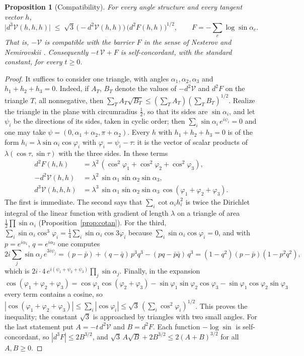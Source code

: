 \documentclass[11pt]{amsart}
\newtheorem{proposition}[theorem]{Proposition}
\theoremstyle{definition}
\theoremstyle{remark}
\begin{document}
\begin{proposition}[Compatibility]\label{prop:compat}
For every angle structure and every tangent vector $h$,
\[
\bigl|d^3\mathcal V(h,h,h)\bigr|\;\le\;\sqrt3\,\bigl(-d^2\mathcal V(h,h)\bigr)\,\bigl(d^2F(h,h)\bigr)^{1/2},\qquad F=-\sum_c\log\sin\alpha_c .
\]
That is, $-\mathcal V$ is compatible with the barrier $F$ in the sense of Nesterov and Nemirovskii \cite{NN94}. Consequently $-t\,\mathcal V+F$ is self-concordant, with the standard constant, for every $t\ge0$.
\end{proposition}

\begin{proof}
It suffices to consider one triangle, with angles $\alpha_1,\alpha_2,\alpha_3$ and $h_1+h_2+h_3=0$. Indeed, if $A_T$, $B_T$ denote the values of $-d^2\mathcal V$ and $d^2F$ on the triangle $T$, all nonnegative, then $\sum_TA_T\sqrt{B_T}\le(\sum_TA_T)(\sum_TB_T)^{1/2}$.
Realize the triangle in the plane with circumradius $\frac12$, so that its sides are $\sin\alpha_i$, and let $\psi_i$ be the directions of its sides, taken in cyclic order; then $\sum_i\sin\alpha_i\,e^{i\psi_i}=0$ and one may take $\psi=(0,\alpha_1+\alpha_2,\pi+\alpha_2)$.
Every $h$ with $h_1+h_2+h_3=0$ is of the form $h_i=\lambda\sin\alpha_i\cos\varphi_i$ with $\varphi_i=\psi_i-\tau$: it is the vector of scalar products of $\lambda(\cos\tau,\sin\tau)$ with the three sides. In these terms
\begin{align*}
d^2F(h,h)&=\lambda^2\,(\cos^2\varphi_1+\cos^2\varphi_2+\cos^2\varphi_3),\\
-d^2\mathcal V(h,h)&=\lambda^2\,\sin\alpha_1\sin\alpha_2\sin\alpha_3,\\
d^3\mathcal V(h,h,h)&=\lambda^3\,\sin\alpha_1\sin\alpha_2\sin\alpha_3\,\cos(\varphi_1+\varphi_2+\varphi_3).
\end{align*}
The first is immediate. The second says that $\sum_i\cot\alpha_ih_i^2$ is twice the Dirichlet integral of the linear function with gradient of length $\lambda$ on a triangle of area $\frac12\prod\sin\alpha_i$ (Proposition~\ref{prop:cotan}).
For the third, $\sum_i\sin\alpha_i\cos^3\varphi_i=\frac14\sum_i\sin\alpha_i\cos3\varphi_i$ because $\sum_i\sin\alpha_i\cos\varphi_i=0$, and with $p=e^{i\alpha_1}$, $q=e^{i\alpha_2}$ one computes
\[
2i\sum_j\sin\alpha_j\,e^{3i\psi_j}=(p-\bar p)+(q-\bar q)\,p^3q^3-(pq-\bar p\bar q)\,q^3=(1-q^2)(p-\bar p)(1-p^2q^2),
\]
which is $2i\cdot4\,e^{i(\psi_1+\psi_2+\psi_3)}\prod_j\sin\alpha_j$.
Finally, in the expansion $\cos(\varphi_1+\varphi_2+\varphi_3)=\cos\varphi_1\cos(\varphi_2+\varphi_3)-\sin\varphi_1\sin\varphi_2\cos\varphi_3-\sin\varphi_1\cos\varphi_2\sin\varphi_3$ every term contains a cosine, so
$|\cos(\varphi_1+\varphi_2+\varphi_3)|\le\sum_i|\cos\varphi_i|\le\sqrt3\,(\sum_i\cos^2\varphi_i)^{1/2}$. This proves the inequality; the constant $\sqrt3$ is approached by triangles with two small angles.
For the last statement put $A=-t\,d^2\mathcal V$ and $B=d^2F$. Each function $-\log\sin$ is self-concordant, so $|d^3F|\le2B^{3/2}$, and $\sqrt3\,A\sqrt B+2B^{3/2}\le2(A+B)^{3/2}$ for all $A,B\ge0$.
\end{proof}
\end{document}
